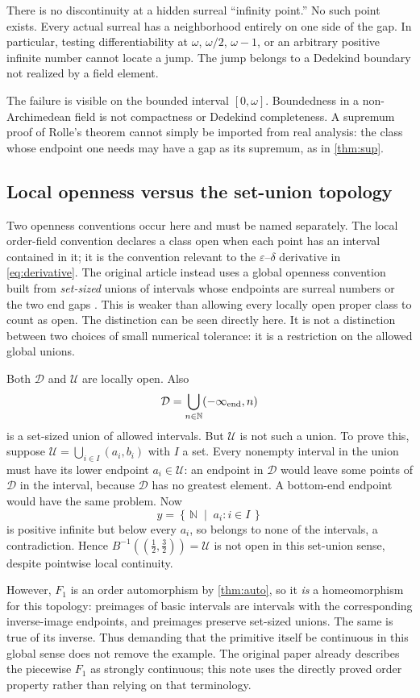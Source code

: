 \documentclass[11pt,letterpaper]{article}
\numberwithin{equation}{section}
\theoremstyle{definition}
\theoremstyle{remark}
\newcommand{\N}{\mathbb{N}}
\newcommand{\U}{\mathcal{U}}
\newcommand{\D}{\mathcal{D}}
\newcommand{\cut}[2]{\left\{\,#1\;\middle|\;#2\,\right\}}
\newcommand{\source}[2]{\cite[#1]{#2}}
\begin{document}
There is no discontinuity at a hidden surreal ``infinity point.'' No such
point exists. Every actual surreal has a neighborhood entirely on one
side of the gap. In particular, testing differentiability at $\omega$,
$\omega/2$, $\omega-1$, or an arbitrary positive infinite number cannot
locate a jump. The jump belongs to a Dedekind boundary not realized by a
field element.

The failure is visible on the bounded interval $[0,\omega]$. Boundedness
in a non-Archimedean field is not compactness or Dedekind completeness.
A supremum proof of Rolle's theorem cannot simply be imported from real
analysis: the class whose endpoint one needs may have a gap as its
supremum, as in \cref{thm:sup}.

\subsection{Local openness versus the set-union topology}
Two openness conventions occur here and must be named separately. The
local order-field convention declares a class open when each point has an
interval contained in it; it is the convention relevant to the
$\varepsilon$--$\delta$ derivative in \eqref{eq:derivative}.
The original article instead uses a global openness convention built from
\emph{set-sized} unions of intervals whose endpoints are surreal numbers
or the two end gaps \source{Definition~7}{RSS}. This is weaker than
allowing every locally open proper class to count as open. The distinction
can be seen directly here. It is not a distinction between two choices of
small numerical tolerance: it is a restriction on the allowed global unions.

Both $\D$ and $\U$ are locally open. Also
\[
 \D=\bigcup_{n\in\N}(-\infty_{\rm end},n)
\]
is a set-sized union of allowed intervals. But $\U$ is not such a union.
To prove this, suppose $\U=\bigcup_{i\in I}(a_i,b_i)$ with $I$ a set.
Every nonempty interval in the union must have its lower endpoint
$a_i\in\U$: an endpoint in $\D$ would leave some points of $\D$ in the
interval, because $\D$ has no greatest element. A bottom-end endpoint
would have the same problem. Now
\[
 y=\cut{\N}{a_i:i\in I}
\]
is positive infinite but below every $a_i$, so belongs to none of the
intervals, a contradiction. Hence $B^{-1}((\tfrac12,\tfrac32))=\U$ is
not open in this set-union sense, despite pointwise local continuity.

However, $F_1$ is an order automorphism by \cref{thm:auto}, so it \emph{is}
a homeomorphism for this topology: preimages of basic intervals are
intervals with the corresponding inverse-image endpoints, and preimages
preserve set-sized unions. The same is true of its inverse. Thus demanding
that the primitive itself be continuous in this global sense does not
remove the example. The original paper already describes the piecewise
$F_1$ as strongly continuous; this note uses the directly proved order
property rather than relying on that terminology.
\end{document}
